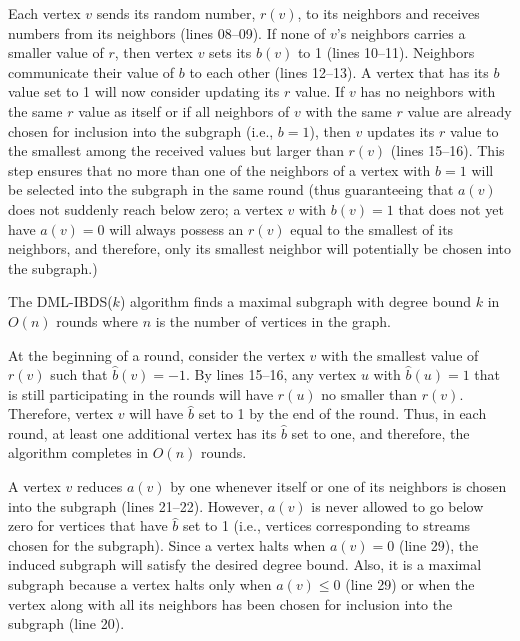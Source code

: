 \documentclass[journal,12pt,onecolumn]{IEEEtran}
\newenvironment{proof}[1][Proof]{\begin{trivlist}
\item[\hskip \labelsep {\bfseries #1}]}{\end{trivlist}}
\begin{document}
Each vertex $v$ sends its
random number, $r(v)$, to its neighbors and receives numbers from its
neighbors (lines 08--09). If none of $v$'s 
neighbors carries a smaller value of $r$, then vertex $v$ sets its
$b(v)$ to 1 (lines 10--11). Neighbors communicate their value of $b$ to each other
(lines 12--13). A vertex that has its $b$ value set to 1 will now consider
updating its $r$ value. If $v$ has no neighbors with the same $r$
value as itself or if all neighbors of $v$ with the same $r$ value are
already chosen for inclusion into the subgraph (i.e., $b=1$), then $v$ updates
its $r$ value to the smallest among the received values but larger
than $r(v)$ (lines 15--16). This step ensures that no more than one
of the neighbors of a vertex with $b=1$ will be selected into the
subgraph in the same round (thus guaranteeing that $a(v)$ does not
suddenly reach below zero; a vertex $v$ with $b(v)=1$ that does not yet
have $a(v) = 0$ will always possess an $r(v)$ equal to the smallest of
its neighbors, and therefore, only its smallest neighbor will
potentially be chosen into the subgraph.) 

\theorem The DML-IBDS($k$) algorithm finds a maximal subgraph
with degree bound $k$ in $O(n)$ rounds where $n$ is the number of
vertices in the graph. 

\begin{proof}
At the beginning of a round, consider the vertex $v$ with the
smallest value of $r(v)$ such that $\hat{b}(v) = -1$. By lines 15--16, any
vertex $u$ with $\hat{b}(u) = 1$ that is still participating in the
rounds will have $r(u)$ no smaller than $r(v)$. Therefore, vertex $v$
will have $\hat{b}$ set to 1 by the end of the round. Thus, in each
round, at least one additional vertex has its $\hat{b}$ set to one, and
therefore, the algorithm completes in $O(n)$ rounds.

A vertex $v$ reduces $a(v)$ by one whenever itself or one of its
neighbors is chosen into the subgraph (lines 21--22). However, $a(v)$ is never allowed to go
below zero for vertices that have $\hat{b}$ set to 1 (i.e., vertices
corresponding to streams chosen for the subgraph). Since a vertex
halts when $a(v) = 0$ (line 29), the induced 
subgraph will satisfy the desired degree bound. Also, it is a maximal
subgraph because a vertex halts only when $a(v) \leq 0$ (line 29) or when the
vertex along with all its neighbors has been chosen for inclusion into
the subgraph (line 20).
\end{proof}
\end{document}
